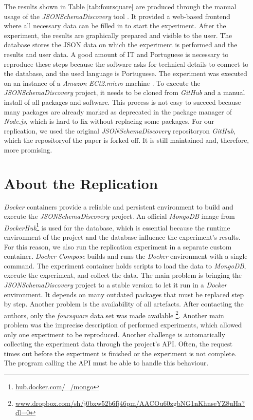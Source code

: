 \documentclass[sigconf, nonacm]{acmart}
\begin{document}


The results shown in Table \ref{tab:foursquare} are produced through the manual usage of the \textit{JSONSchemaDiscovery} tool \cite{8424731}. It provided a web-based frontend where all necessary data can be filled in to start the experiment. After the experiment, the results are graphically prepared and visible to the user. The database stores the JSON data on which the experiment is performed and the results and user data. A good amount of IT and Portuguese is necessary to reproduce these steps because the software asks for technical details to connect to the database, and the used language is Portuguese. The experiment was executed on an instance of a \textit{Amazon ECt2.micro} machine \cite{8424731}. To execute the \textit{JSONSchemaDiscovery} project, it needs to be cloned from \textit{GitHub} and a manual install of all packages and software. This process is not easy to succeed because many packages are already marked as deprecated in the package manager of \textit{Node.js}, which is hard to fix without replacing some packages. For our replication, we used the original \textit{JSONSchemaDiscovery} repository\footnotemark[1] on \textit{GitHub}, which the repository\footnotemark[2] of the paper is forked off. It is still maintained and, therefore, more promising.

\clearpage

\section{About the Replication}

\textit{Docker} containers provide a reliable and persistent environment to build and execute the \textit{JSONSchemaDiscovery} project. An official \textit{MongoDB} image from \textit{DockerHub}\footnote{\url{hub.docker.com/_/mongo}} is used for the database, which is essential because the runtime environment of the project and the database influence the experiment's results. For this reason, we also run the replication experiment in a separate custom container. \textit{Docker Compose} builds and runs the \textit{Docker} environment with a single command. The experiment container holds scripts to load the data to \textit{MongoDB}, execute the experiment, and collect the data. The main problem is bringing the \textit{JSONSchemaDiscovery} project to a stable version to let it run in a \textit{Docker} environment. It depends on many outdated packages that must be replaced step by step. Another problem is the availability of all artefacts. After contacting the authors, only the \textit{foursquare} data set \cite{ccelikten2016modeling} was made available \footnote{\url{www.dropbox.com/sh/j0bxw52b6fj46pm/AACOu60zgbNG1nKhnseYZ8uHa?dl=0}}. Another main problem was the imprecise description of performed experiments, which allowed only one experiment to be reproduced. Another challenge is automatically collecting the experiment data through the project's API. Often, the request times out before the experiment is finished or the experiment is not complete. The program calling the API must be able to handle this behaviour.
\end{document}
